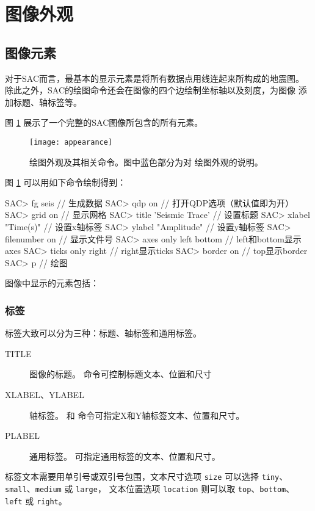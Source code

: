 \section{图像外观}
\label{sec:plot-appearance}

\subsection{图像元素}
对于SAC而言，最基本的显示元素是将所有数据点用线连起来所构成的地震图。
除此之外，SAC的绘图命令还会在图像的四个边绘制坐标轴以及刻度，为图像
添加标题、轴标签等。

图 \ref{fig:plot-appearance} 展示了一个完整的SAC图像所包含的所有元素。

\begin{figure}[H]
\centering
\texttt{[image: appearance]}
\caption[绘图外观相关命令]{绘图外观及其相关命令。图中蓝色部分为对
    绘图外观的说明。}
\label{fig:plot-appearance}
\end{figure}

图 \ref{fig:plot-appearance} 可以用如下命令绘制得到：
\begin{SACCode}
SAC> fg seis                // 生成数据
SAC> qdp on                 // 打开QDP选项（默认值即为开）
SAC> grid on                // 显示网格
SAC> title 'Seismic Trace'  // 设置标题
SAC> xlabel "Time(s)"       // 设置x轴标签
SAC> ylabel "Amplitude"     // 设置y轴标签
SAC> filenumber on          // 显示文件号
SAC> axes only left bottom  // left和bottom显示axes
SAC> ticks only right       // right显示ticks
SAC> border on              // top显示border
SAC> p                      // 绘图
\end{SACCode}

图像中显示的元素包括：
\subsubsection{标签}
标签大致可以分为三种：标题、轴标签和通用标签。
\begin{description}
\item[TITLE] 图像的标题。 命令可控制标题文本、位置和尺寸
\item[XLABEL、YLABEL] 轴标签。 和 
    命令可指定X和Y轴标签文本、位置和尺寸。
\item[PLABEL] 通用标签。 可指定通用标签的文本、位置和尺寸。
\end{description}

标签文本需要用单引号或双引号包围，文本尺寸选项 \texttt{size} 可以选择
\texttt{tiny}、\texttt{small}、\texttt{medium} 或 \texttt{large}，
文本位置选项 \texttt{location} 则可以取 \texttt{top}、\texttt{bottom}、
\texttt{left} 或 \texttt{right}。


